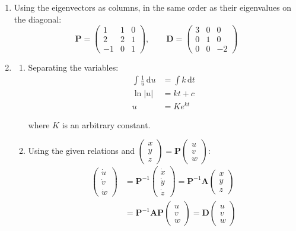 \documentclass[leqno]{article}
\begin{document}
\begin{enumerate}[
  label=\textbf{\arabic*.},
  leftmargin=*,
  topsep=0pt,
  partopsep=0pt,
  parsep=0pt
]
\begin{djsSolution}
\begin{enumerate}[label=\textbf{(\alph*)}, start=1]
\begin{enumerate}[label=(\roman*), start=1]
  \end{enumerate}
  \item Using the eigenvectors as columns, in the same order as their eigenvalues on the diagonal:
\[
\mathbf{P}=\begin{pmatrix}1&1&0\\ 2&2&1\\ -1&0&1\end{pmatrix},\qquad \mathbf{D}=\begin{pmatrix}3&0&0\\ 0&1&0\\ 0&0&-2\end{pmatrix}
\]

  \item
  \begin{enumerate}[label=(\roman*), start=1]
    \item Separating the variables:
\begin{align*}
\int\frac{1}{u}\,\mathrm{d}u&=\int k\,\mathrm{d}t\\
\ln|u|&=kt+c\\
u&=Ke^{kt}
\end{align*}

where \(K\) is an arbitrary constant.

    \item Using the given relations and \(\begin{pmatrix}x\\ y\\ z\end{pmatrix}=\mathbf{P}\begin{pmatrix}u\\ v\\ w\end{pmatrix}\):
\begin{align*}
\begin{pmatrix}\dot{u}\\ \dot{v}\\ \dot{w}\end{pmatrix}&=\mathbf{P}^{-1}\begin{pmatrix}\dot{x}\\ \dot{y}\\ \dot{z}\end{pmatrix}=\mathbf{P}^{-1}\mathbf{A}\begin{pmatrix}x\\ y\\ z\end{pmatrix}\\
&=\mathbf{P}^{-1}\mathbf{A}\mathbf{P}\begin{pmatrix}u\\ v\\ w\end{pmatrix}=\mathbf{D}\begin{pmatrix}u\\ v\\ w\end{pmatrix}
\end{align*}


\end{enumerate}
\end{enumerate}
\end{djsSolution}
\end{enumerate}
\end{document}
